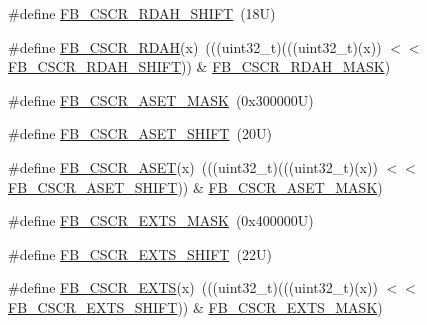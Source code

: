 \begin{DoxyCompactItemize}
\#define \mbox{\hyperlink{group___f_b___register___masks_gaade1cbb82ddd98295330c376eabcca7e}{F\+B\+\_\+\+C\+S\+C\+R\+\_\+\+R\+D\+A\+H\+\_\+\+S\+H\+I\+FT}}~(18\+U)
\item 
\#define \mbox{\hyperlink{group___f_b___register___masks_ga54849fb23896ad9ddd312de4bb8d0a09}{F\+B\+\_\+\+C\+S\+C\+R\+\_\+\+R\+D\+AH}}(x)~(((uint32\+\_\+t)(((uint32\+\_\+t)(x)) $<$$<$ \mbox{\hyperlink{group___f_b___register___masks_gaade1cbb82ddd98295330c376eabcca7e}{F\+B\+\_\+\+C\+S\+C\+R\+\_\+\+R\+D\+A\+H\+\_\+\+S\+H\+I\+FT}})) \& \mbox{\hyperlink{group___f_b___register___masks_ga31adeea4793143604b28e1ca000b19df}{F\+B\+\_\+\+C\+S\+C\+R\+\_\+\+R\+D\+A\+H\+\_\+\+M\+A\+SK}})
\item 
\#define \mbox{\hyperlink{group___f_b___register___masks_gaef9bac6317316a7b6d4e2df3526b206f}{F\+B\+\_\+\+C\+S\+C\+R\+\_\+\+A\+S\+E\+T\+\_\+\+M\+A\+SK}}~(0x300000\+U)
\item 
\#define \mbox{\hyperlink{group___f_b___register___masks_ga287d608bea3c47b85bdd3d707460da64}{F\+B\+\_\+\+C\+S\+C\+R\+\_\+\+A\+S\+E\+T\+\_\+\+S\+H\+I\+FT}}~(20\+U)
\item 
\#define \mbox{\hyperlink{group___f_b___register___masks_gaa264e82012f6dff6f57409006aeb7f81}{F\+B\+\_\+\+C\+S\+C\+R\+\_\+\+A\+S\+ET}}(x)~(((uint32\+\_\+t)(((uint32\+\_\+t)(x)) $<$$<$ \mbox{\hyperlink{group___f_b___register___masks_ga287d608bea3c47b85bdd3d707460da64}{F\+B\+\_\+\+C\+S\+C\+R\+\_\+\+A\+S\+E\+T\+\_\+\+S\+H\+I\+FT}})) \& \mbox{\hyperlink{group___f_b___register___masks_gaef9bac6317316a7b6d4e2df3526b206f}{F\+B\+\_\+\+C\+S\+C\+R\+\_\+\+A\+S\+E\+T\+\_\+\+M\+A\+SK}})
\item 
\#define \mbox{\hyperlink{group___f_b___register___masks_ga1bc7960fd554faa076ba6e34fddaf081}{F\+B\+\_\+\+C\+S\+C\+R\+\_\+\+E\+X\+T\+S\+\_\+\+M\+A\+SK}}~(0x400000\+U)
\item 
\#define \mbox{\hyperlink{group___f_b___register___masks_ga095a10ba51cbcdf10aca9bf9d5692613}{F\+B\+\_\+\+C\+S\+C\+R\+\_\+\+E\+X\+T\+S\+\_\+\+S\+H\+I\+FT}}~(22\+U)
\item 
\#define \mbox{\hyperlink{group___f_b___register___masks_ga1b685e064ec1ee2a23c9f772a3394604}{F\+B\+\_\+\+C\+S\+C\+R\+\_\+\+E\+X\+TS}}(x)~(((uint32\+\_\+t)(((uint32\+\_\+t)(x)) $<$$<$ \mbox{\hyperlink{group___f_b___register___masks_ga095a10ba51cbcdf10aca9bf9d5692613}{F\+B\+\_\+\+C\+S\+C\+R\+\_\+\+E\+X\+T\+S\+\_\+\+S\+H\+I\+FT}})) \& \mbox{\hyperlink{group___f_b___register___masks_ga1bc7960fd554faa076ba6e34fddaf081}{F\+B\+\_\+\+C\+S\+C\+R\+\_\+\+E\+X\+T\+S\+\_\+\+M\+A\+SK}})
\item 
$$
\end{DoxyCompactItemize}
